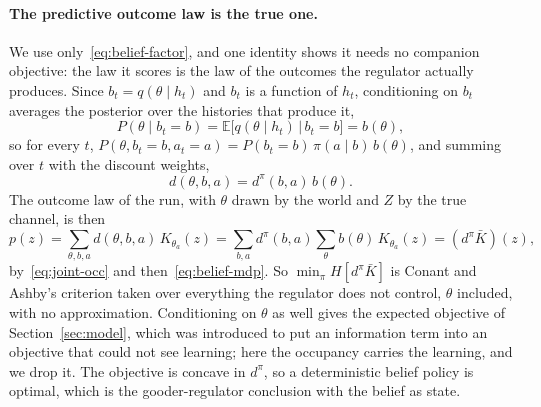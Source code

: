 \documentclass[11pt]{article}
\theoremstyle{remark}
\newcommand{\E}{\mathbb E}
\newcommand{\1}{\mathds{1}}
\newcommand{\occ}{d^{\pi}}
\newcommand{\Hf}[1]{H\!\left[#1\right]}
\begin{document}
\paragraph{The predictive outcome law is the true one.}
We use only~\eqref{eq:belief-factor}, and one identity shows it needs no companion objective: the law it scores is the law of the outcomes the regulator actually produces.
Since $b_t=q(\theta\mid h_t)$ and $b_t$ is a function of $h_t$, conditioning on $b_t$ averages the posterior over the histories that produce it,
\begin{equation}
  P(\theta\mid b_t=b)=\E\big[q(\theta\mid h_t)\,\big|\,b_t=b\big]=b(\theta),
\end{equation}
so for every $t$, $P(\theta,b_t=b,a_t=a)=P(b_t=b)\,\pi(a\mid b)\,b(\theta)$, and summing over $t$ with the discount weights,
\begin{equation}
  d(\theta,b,a)=\occ(b,a)\,b(\theta).
  \label{eq:joint-occ}
\end{equation}
The outcome law of the run, with $\theta$ drawn by the world and $Z$ by the true channel, is then
\begin{equation}
  p(z)=\sum_{\theta,b,a}d(\theta,b,a)\,K_{\theta_a}(z)
  =\sum_{b,a}\occ(b,a)\sum_\theta b(\theta)\,K_{\theta_a}(z)
  =(\occ\bar K)(z),
\end{equation}
by~\eqref{eq:joint-occ} and then~\eqref{eq:belief-mdp}.
So $\min_\pi\Hf{\occ\bar K}$ is Conant and Ashby's criterion taken over everything the regulator does not control, $\theta$ included, with no approximation.
Conditioning on $\theta$ as well gives the expected objective of Section~\ref{sec:model}, which was introduced to put an information term into an objective that could not see learning; here the occupancy carries the learning, and we drop it.
The objective is concave in $\occ$, so a deterministic belief policy is optimal, which is the gooder-regulator conclusion with the belief as state.
\end{document}
